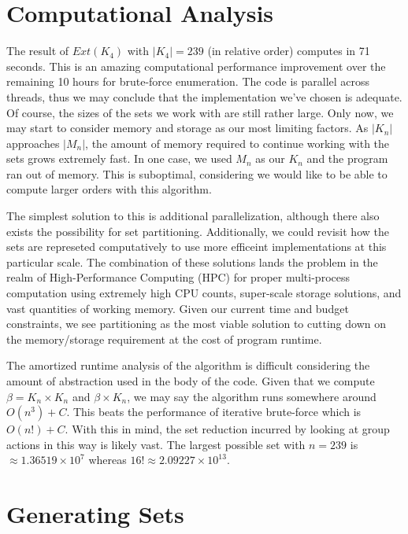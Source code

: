 \documentclass[12pt]{report}
\begin{document}
\section{Computational Analysis}

\par The result of $Ext\left(K_4\right)$ with $\left|K_4\right|=239$ (in relative order) computes
in 71
seconds. This is an amazing computational performance improvement over the remaining 10 hours for
brute-force enumeration. The code is parallel across threads, thus we may conclude that the
implementation we've chosen is adequate. Of course, the sizes of the sets we work with are still
rather large. Only now, we may start to consider memory and storage as our most limiting factors. As
$\left|K_n\right|$ approaches $\left|M_n\right|$, the amount of memory required to continue working
with the sets grows extremely fast. In one case, we used $M_n$ as our $K_n$ and the program ran out
of memory. This is suboptimal, considering we would like to be able to compute larger orders with
this algorithm.

\par The simplest solution to this is additional parallelization, although there also exists the
possibility for set partitioning. Additionally, we could revisit how the sets are represeted
computatively to use more efficeint implementations at this particular scale.
The combination of these solutions lands the problem in the realm
of High-Performance Computing (HPC) for proper multi-process computation using extremely high CPU
counts, super-scale storage solutions, and vast quantities of working memory. Given our current
time and budget constraints, we see partitioning as the most viable solution to cutting down on the
memory/storage requirement at the cost of program runtime.

\par The amortized runtime analysis of the algorithm is difficult considering the amount of
abstraction used in the body of the code. Given that we compute $\beta = K_n \times K_n$ and $\beta
  \times K_n$, we may say the algorithm runs somewhere around $O\left(n^3\right)+C$. This beats the
performance of iterative brute-force which is $O\left(n!\right)+C$. With this in mind, the set
reduction incurred by looking at group actions in this way is likely vast. The largest possible set
with $n=239$ is $\approx 1.36519 \times 10^7$ whereas $16!\approx 2.09227 \times 10^{13}$.

\section{Generating Sets}
\end{document}
